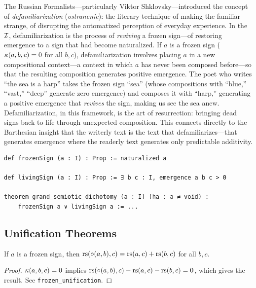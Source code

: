 \begin{remark}
The Russian Formalists---particularly Viktor Shklovsky---introduced the concept of \emph{defamiliarization} (\textit{ostranenie}): the literary technique of making the familiar strange, of disrupting the automatized perception of everyday experience. In the $\mathcal{I}$, defamiliarization is the process of \emph{reviving} a frozen sign---of restoring emergence to a sign that had become naturalized. If $a$ is a frozen sign ($\kappa(a, b, c) = 0$ for all $b, c$), defamiliarization involves placing $a$ in a new compositional context---a context in which $a$ has never been composed before---so that the resulting composition generates positive emergence. The poet who writes ``the sea is a harp'' takes the frozen sign ``sea'' (whose compositions with ``blue,'' ``vast,'' ``deep'' generate zero emergence) and composes it with ``harp,'' generating a positive emergence that \emph{revives} the sign, making us see the sea anew. Defamiliarization, in this framework, is the art of resurrection: bringing dead signs back to life through unexpected composition. This connects directly to the Barthesian insight that the writerly text is the text that defamiliarizes---that generates emergence where the readerly text generates only predictable additivity.
\end{remark}

\begin{lstlisting}[caption={Frozen and living signs: the grand dichotomy}]
def frozenSign (a : I) : Prop := naturalized a

def livingSign (a : I) : Prop := ∃ b c : I, emergence a b c > 0

theorem grand_semiotic_dichotomy (a : I) (ha : a ≠ void) :
    frozenSign a ∨ livingSign a := ...
\end{lstlisting}

\subsection{Unification Theorems}

\begin{theorem}
\label{thm:frozen-leftlinear}
If $a$ is a frozen sign, then
$\mathrm{rs}(\circ(a, b), c) = \mathrm{rs}(a, c) + \mathrm{rs}(b, c)$ for all $b, c$.
\end{theorem}

\begin{proof}
$\kappa(a, b, c) = 0$ implies
$\mathrm{rs}(\circ(a,b), c) - \mathrm{rs}(a,c) - \mathrm{rs}(b,c) = 0$, which gives
the result. See \texttt{frozen\_unification}.
\end{proof}

